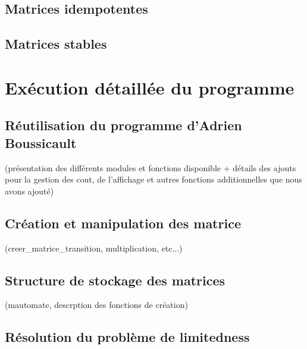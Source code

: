 \documentclass{report}
\begin{document}
\chapter{Matrices idempotentes}

\chapter{Matrices stables}

\part{Exécution détaillée du programme}

\chapter{Réutilisation du programme d'Adrien Boussicault}

(présentation des différents modules et fonctions disponible + détails des ajouts pour la gestion des cout, de l'affichage et autres fonctions additionnelles que nous avons ajouté)

\chapter{Création et manipulation des matrice}

(creer\_matrice\_transition, multiplication, etc...)

\chapter{Structure de stockage des matrices}

(mautomate, descrption des fonctions de création)

\chapter{Résolution du problème de limitedness}



\end{document}
